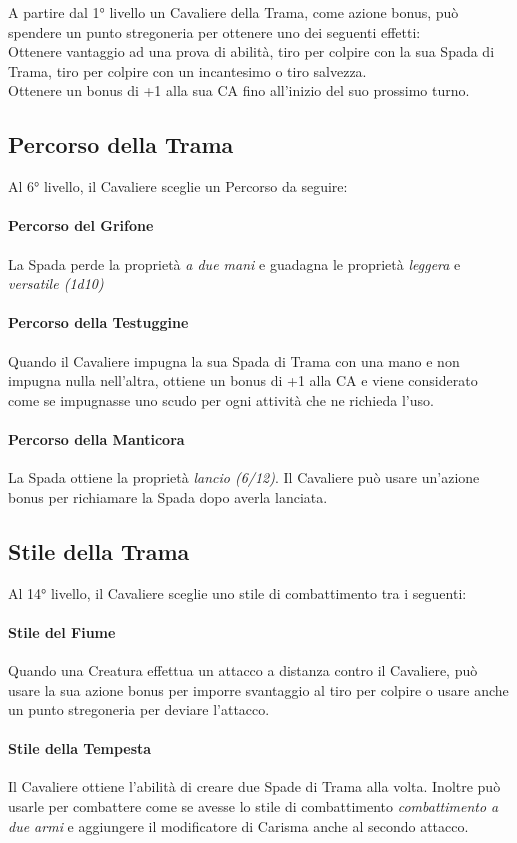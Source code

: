 A partire dal 1° livello un Cavaliere della Trama, come azione bonus, può spendere un punto stregoneria per ottenere uno dei seguenti effetti: \\
Ottenere vantaggio ad una prova di abilità, tiro per colpire con la sua Spada di Trama, tiro per colpire con un incantesimo o tiro salvezza. \\
Ottenere un bonus di +1 alla sua CA fino all'inizio del suo prossimo turno.

\subsection{Percorso della Trama}

Al 6° livello, il Cavaliere sceglie un Percorso da seguire:
\paragraph{Percorso del Grifone} La Spada perde la proprietà \textit{a due mani} e guadagna le proprietà \textit{leggera} e \textit{versatile (1d10)}
\paragraph{Percorso della Testuggine} Quando il Cavaliere impugna la sua Spada di Trama con una mano e non impugna nulla nell'altra, ottiene un bonus di +1 alla CA e viene considerato come se impugnasse uno scudo per ogni attività che ne richieda l'uso.
\paragraph{Percorso della Manticora} La Spada ottiene la proprietà \textit{lancio (6/12)}. Il Cavaliere può usare un'azione bonus per richiamare la Spada dopo averla lanciata.

\subsection{Stile della Trama}
Al 14° livello, il Cavaliere sceglie uno stile di combattimento tra i seguenti:
\paragraph{Stile del Fiume} Quando una Creatura effettua un attacco a distanza contro il Cavaliere, può usare la sua azione bonus per imporre svantaggio al tiro per colpire o usare anche un punto stregoneria per deviare l'attacco.
\paragraph{Stile della Tempesta} Il Cavaliere ottiene l'abilità di creare due Spade di Trama alla volta. Inoltre può usarle per combattere come se avesse lo stile di combattimento \textit{combattimento a due armi} e aggiungere il modificatore di Carisma anche al secondo attacco.
